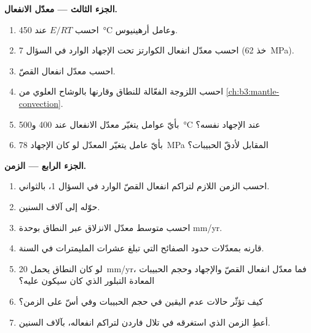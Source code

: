 \begin{problem}
\medskip\noindent\textbf{الجزء الثالث --- معدّل الانفعال.}
\begin{enumerate}[resume]
  \item احسب $E/RT$ عند \qty{450}{\celsius} وعامل أرهينيوس.
  \item احسب معدّل انفعال الكوارتز تحت الإجهاد الوارد في السؤال 7
        (خذ \qty{62}{MPa}).
  \item احسب معدّل انفعال القصّ.
  \item احسب اللزوجة الفعّالة للنطاق وقارنها بالوشاح العلوي
        من \cref{ch:b3:mantle-convection}.
  \item بأيّ عوامل يتغيّر معدّل الانفعال عند 400
        و\qty{500}{\celsius} عند الإجهاد نفسه؟
  \item بأيّ عامل يتغيّر المعدّل لو كان الإجهاد \qty{78}{MPa} المقابل
        لأدقّ الحبيبات؟
\end{enumerate}

\medskip\noindent\textbf{الجزء الرابع --- الزمن.}
\begin{enumerate}[resume]
  \item احسب الزمن اللازم لتراكم انفعال القصّ الوارد في السؤال 1،
        بالثواني.
  \item حوّله إلى آلاف السنين.
  \item احسب متوسط معدّل الانزلاق عبر النطاق بوحدة \unit{mm/yr}.
  \item قارنه بمعدّلات حدود الصفائح التي تبلغ عشرات المليمترات في السنة.
  \item لو كان النطاق يحمل \qty{20}{mm/yr}، فما معدّل انفعال القصّ والإجهاد
        وحجم الحبيبات المعادة التبلور الذي كان سيكون عليه؟
  \item كيف تؤثّر حالات عدم اليقين في حجم الحبيبات وفي أسّ 
        على الزمن؟
  \item أعطِ الزمن الذي استغرقه  في تلال فاردن لتراكم انفعاله، بآلاف
        السنين.
\end{enumerate}
\end{problem}
